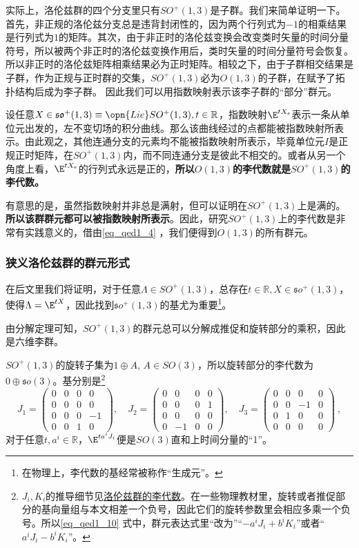 实际上，洛伦兹群的四个分支里只有$SO^+(1,3)$是子群。我们来简单证明一下。首先，非正规的洛伦兹分支总是违背封闭性的，因为两个行列式为$-1$的相乘结果是行列式为$1$的矩阵。其次，由于非正时的洛伦兹变换会改变类时矢量的时间分量符号，所以被两个非正时的洛伦兹变换作用后，类时矢量的时间分量符号会恢复。所以非正时的洛伦兹矩阵相乘结果必为正时矩阵。相较之下，由于子群相交结果是子群，作为正规与正时群的交集，$SO^+(1,3)$必为$O(1,3)$的子群，在赋予了拓扑结构后成为李子群。%
因此我们可以用指数映射表示该李子群的“部分”群元。

设任意$X\in \mathfrak{so}^+(1,3)\equiv\opn{Lie} SO^+(1,3),t\in \mathbb R$，指数映射$\E^{tX_e}$表示一条从单位元出发的，左不变切场的积分曲线。那么该曲线经过的点都能被指数映射所表示。由此观之，其他连通分支的元素均不能被指数映射所表示，毕竟单位元$I$是正规正时矩阵，在$SO^+(1,3)$内，而不同连通分支是彼此不相交的。或者从另一个角度上看，$\E^{tX_e}$的行列式永远是正的，\textbf{所以$O(1,3)$的李代数就是$SO^+(1,3)$的李代数。}

有意思的是，虽然指数映射并非总是满射，但可以证明在$SO^+(1,3)$上是满的。
\textbf{所以该群群元都可以被指数映射所表示}。因此，研究$SO^+(1,3)$上的李代数是非常有实践意义的，借由\autoref{eq_qed1_4} ，我们便得到$O(1,3)$的所有群元。

\subsubsection{狭义洛伦兹群的群元形式}
在后文里我们将证明，对于任意$\Lambda\in SO^+(1,3)$，总存在$t\in \mathbb R,X\in \mathfrak so^+(1,3)$，使得$\Lambda=\E^{tX}$，因此找到$\mathfrak so^+(1,3)$的基尤为重要\footnote{在物理上，李代数的基经常被称作“生成元”。}。

由分解定理可知，$SO^+(1,3)$的群元总可以分解成推促和旋转部分的乘积，因此是六维李群。


$SO^+(1,3)$的旋转子集为$1\oplus A,\,A\in SO(3)$，所以旋转部分的李代数为$0\oplus \mathfrak so(3)$。基分别是\footnote{$J_i,K_i$的推导细节见\href{https://wuli.wiki/online/lielot.html}{洛伦兹群的李代数}。在一些物理教材里，旋转或者推促部分的基向量组与本文相差一个负号，因此它们的旋转参数里会相应多乘一个负号。所以\autoref{eq_qed1_10} 式中，群元表达式里“改为”“$-a^iJ_i+b^iK_i$”或者“$a^iJ_i-b^iK_i$”。}
\begin{equation}
J_{1}=\begin{pmatrix}0&0&0&0\\0&0&0&0\\0&0&0&-1\\0&0&1&0\end{pmatrix},\quad J_{2}=\begin{pmatrix}0&0&0&0\\0&0&0&1\\0&0&0&0\\0&-1&0&0\end{pmatrix},\quad J_{3}=\begin{pmatrix}0&0&0&0\\0&0&-1&0\\0&1&0&0\\0&0&0&0\end{pmatrix}~,
\end{equation}
对于任意$t,a^i\in\mathbb R$，$\E^{ta^iJ_i}$便是$SO(3)$直和上时间分量的“1”。


